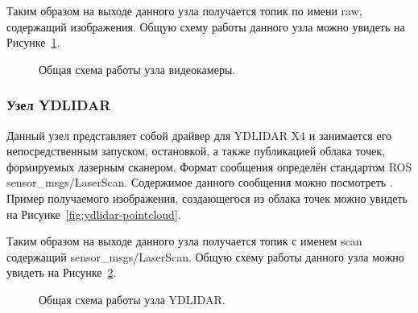 Таким образом на выходе данного узла получается топик по имени raw, содержащий изображения. Общую схему работы данного узла можно увидеть на Рисунке~\ref{fig:node-videocamera}.

\begin{figure}[ht]
  \caption{Общая схема работы узла видеокамеры.}\label{fig:node-videocamera}
\end{figure}

\subsubsection{Узел YDLIDAR}
Данный узел представляет собой драйвер для YDLIDAR X4 и занимается его непосредственным запуском, остановкой, а также публикацией облака точек, формируемых лазерным сканером. Формат сообщения определён стандартом ROS sensor\_msgs/LaserScan.  Содержимое данного сообщения можно посмотреть . Пример получаемого изображения, создающегося из облака точек можно увидеть на Рисунке~\ref{fig:ydlidar-pointcloud}. 

Таким образом на выходе данного узла получается топик с именем scan содержащий sensor\_msgs/LaserScan. Общую схему работы данного узла можно увидеть на Рисунке~\ref{fig:node-ydlidar}.

\begin{figure}[ht]
  \caption{Общая схема работы узла YDLIDAR.}\label{fig:node-ydlidar}
\end{figure}

